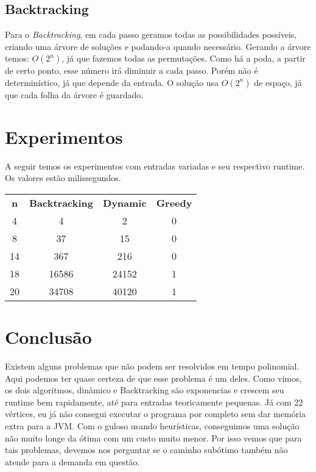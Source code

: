 \documentclass[a4paper,11pt,oneside]{article}
\begin{document}
    \subsection{Backtracking}
    Para o \textit{Backtracking}, em cada passo geramos todas as possibilidades poss\'iveis, criando uma \'arvore de solu\c{c}\~{o}es e podando-a quando necess\'ario. Gerando a \'arvore temos: \begin{math} O(2^n) \end{math}, j\'a que fazemos todas as permuta\c{c}\~{o}es. Como h\'a a poda, a partir de certo ponto, esse n\'umero ir\'a diminuir a cada passo. Por\'em n\~{a}o \'e determin\'istico, j\'a que depende da entrada. 
    O solu\c{c}\~{a}o usa \begin{math} O(2^n) \end{math} de espa\c{c}o, j\'a que cada folha da \'arvore \'e guardado.
    
    \section{Experimentos}
    
    A seguir temos os experimentos com entradas variadas e seu respectivo runtime. Os valores est\~{a}o milissegundos.
    
    \begin{center}
      \begin{tabular}{c c c c}
      \textbf{n} & \textbf{Backtracking} & \textbf{Dynamic} & \textbf{Greedy} \\
      4 & 4 & 2 & 0 \\
      8 & 37 & 15 & 0 \\
      14 & 367 & 216 & 0 \\
      18 & 16586 & 24152 & 1 \\
      20 & 34708 & 40120 & 1 \\
      \end{tabular}
    \end{center}
    
    \section{Conclus\~{a}o}
    Existem alguns problemas que n\~{a}o podem ser resolvidos em tempo polinomial. Aqui podemos ter quase certeza de que esse problema \'e um deles. Como vimos, os dois algoritmos, din\^amico e Backtracking s\~{a}o exponencias e crescem seu runtime bem rapidamente, at\'e para entradas teoricamente pequenas. J\'a com 22 v\'ertices, eu j\'a n\~{a}o consegui executar o programa por completo sem dar mem\'oria extra para a JVM.
    Com o guloso usando heur\'isticas, conseguimos uma solu\c{c}\~{a}o n\~{a}o muito longe da \'otima com um custo muito menor. Por isso vemos que para tais problemas, devemos nos perguntar se o caminho sub\'otimo tamb\'em n\~{a}o atende para a demanda em quest\~{a}o. 
    


    
    

    
    
\end{document}

